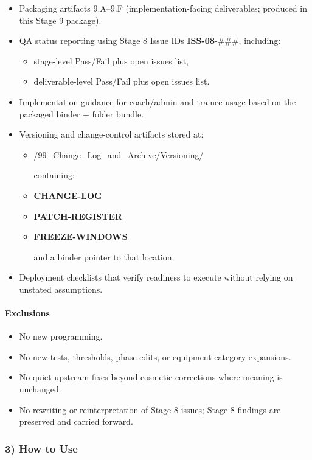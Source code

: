 \documentclass[10pt]{article}
\begin{document}
\begin{itemize}
\item Packaging artifacts 9.A–9.F (implementation-facing deliverables; produced in this Stage 9 package).
\item QA status reporting using Stage 8 Issue IDs \textbf{ISS-08}-\#\#\#, including:
  \begin{itemize}
  \item stage-level Pass/Fail plus open issues list,
  \item deliverable-level Pass/Fail plus open issues list.
  \end{itemize}
\item Implementation guidance for coach/admin and trainee usage based on the packaged binder + folder bundle.
\item Versioning and change-control artifacts stored at:
  \begin{itemize}
  \item /99\_Change\_Log\_and\_Archive/Versioning/
  
  containing:
  \item \textbf{CHANGE-LOG}
  \item \textbf{PATCH-REGISTER}
  \item \textbf{FREEZE-WINDOWS}
  
  and a binder pointer to that location.
  \end{itemize}
\item Deployment checklists that verify readiness to execute without relying on unstated assumptions.
\end{itemize}

\paragraph*{Exclusions}

\begin{itemize}
\item No new programming.
\item No new tests, thresholds, phase edits, or equipment-category expansions.
\item No quiet upstream fixes beyond cosmetic corrections where meaning is unchanged.
\item No rewriting or reinterpretation of Stage 8 issues; Stage 8 findings are preserved and carried forward.
\end{itemize}

\subsubsection*{3) How to Use}
\end{document}
